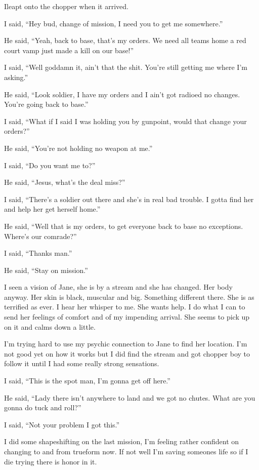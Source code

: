 ﻿\lettrine[lines=2,lraise=0]{I}\space leapt onto the chopper when it arrived.

I said, ``Hey bud, change of mission, I need you to get me somewhere.''

He said, ``Yeah, back to base, that's my orders. We need all teams home a red court vamp just made a kill on our base!''

I said, ``Well goddamn it, ain't that the shit. You're still getting me where I'm asking.''

He said, ``Look soldier, I have my orders and I ain't got radioed no changes. You're going back to base.''

I said, ``What if I said I was holding you by gunpoint, would that change your orders?''

He said, ``You're not holding no weapon at me.''

I said, ``Do you want me to?''

He said, ``Jesus, what's the deal miss?''

I said, ``There's a soldier out there and she's in real bad trouble. I gotta find her and help her get herself home.''

He said, ``Well that is my orders, to get everyone back to base no exceptions. Where's our comrade?''

I said, ``Thanks man.''

He said, ``Stay on mission.''


I seen a vision of Jane, she is by a stream and she has changed. Her body anyway. Her skin is black, muscular and big. Something different there. She is as terrified as ever. I hear her whisper to me. She wants help. I do what I can to send her feelings of comfort and of my impending arrival. She seems to pick up on it and calms down a little.

\parasep

I'm trying hard to use my psychic connection to Jane to find her location. I'm not good yet on how it works but I did find the stream and got chopper boy to follow it until I had some really strong sensations.

I said, ``This is the spot man, I'm gonna get off here.''

He said, ``Lady there isn't anywhere to land and we got no chutes. What are you gonna do tuck and roll?''

I said, ``Not your problem I got this.''

I did some shapeshifting on the last mission, I'm feeling rather confident on changing to and from trueform now. If not well I'm saving someones life so if I die trying there is honor in it.

